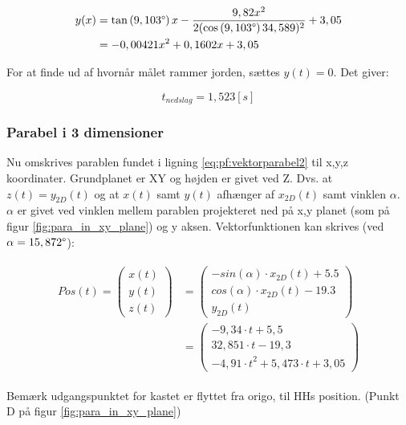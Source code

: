 \begin{align}
\begin{split}
y(x) &= \tan \left(9,103 \degree \right) x - \frac{9,82x^2}{2(\cos \left(9,103 \degree \right) 34,589)^2} + 3,05 \\
&= - 0,00421 x^2 + 0,1602 x  + 3,05
\label{eq:pf:y(x)3}
\end{split}
\end{align}

For at finde ud af hvornår målet rammer jorden, sættes \(y(t) = 0\). Det giver:

\begin{equation}
t_{nedslag} = 1,523 [s]
\label{eq:pf:nedslagstid}
\end{equation}

\subsubsection{Parabel i 3 dimensioner}
\label{subsubsec:para}
Nu omskrives parablen fundet i ligning \ref{eq:pf:vektorparabel2} til x,y,z koordinater. 
Grundplanet er XY og højden er givet ved Z. Dvs. at \(z(t) = y_{2D}(t)\) og at \(x(t)\) samt \(y(t)\) afhænger af \(x_{2D}(t)\) samt vinklen \(\alpha\). 
\(\alpha\) er givet ved vinklen mellem parablen projekteret ned på x,y planet (som på figur \ref{fig:para_in_xy_plane}) og y aksen. 
Vektorfunktionen kan skrives (ved \(\alpha = 15,872 \degree\)): 

\begin{align}
\begin{split}
Pos\left( t \right) = 
\left( \begin{matrix} x\left( t \right)  \\
 y\left( t \right)  \\ 
 z\left( t \right)  \end{matrix} \right) &=
 \left( \begin{matrix} - sin\left( \alpha  \right) \cdot { x }_{ 2D }\left( t \right) + 5.5 \\
 cos\left( \alpha  \right) \cdot { x }_{ 2D }\left( t \right) - 19.3  \\
  { y }_{ 2D }\left( t \right)  \end{matrix} \right)
\\
&= \left( \begin{matrix} - 9,34\cdot t+5,5 \\
  32,851\cdot t-19,3 \\ 
 -{ 4,91\cdot t }^{ 2 }+5,473\cdot t+3,05\end{matrix} \right) 
\label{eq:pf:vektorparabel3d}
\end{split}
\end{align}





Bemærk udgangspunktet for kastet er flyttet fra origo, til HHs position. (Punkt D på figur \ref{fig:para_in_xy_plane})
